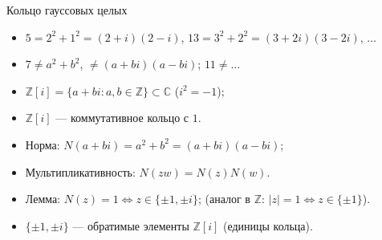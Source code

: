 \documentclass[serif, aspectratio=169]{beamer}
\begin{document}
\begin{frame}{Кольцо гауссовых целых}
    \begin{itemize}
        \item $5=2^2+1^2=(2+i)(2-i)$, $13=3^2+2^2=(3+2i)(3-2i)$, $\dots$
        \item $7\neq a^2+b^2$, $\neq (a+bi)(a-bi)$; $11\neq\dots$
        \item $\mathbb{Z}[i] = \{a+bi : a,b\in\mathbb{Z}\}\subset\mathbb{C}$ ($i^2=-1$);
        \item $\mathbb{Z}[i]$ --- коммутативное кольцо с $1$.
        \item Норма: $N(a+bi)=a^2+b^2=(a+bi)(a-bi)$;
        \item Мультипликативность: $N(zw)=N(z)N(w)$.
        \item Лемма: $N(z)=1 \Leftrightarrow z\in\{\pm1,\pm i\}$; (аналог в $\mathbb{Z}$: $|z|=1 \Leftrightarrow z\in\{\pm1\}$).
        \item $\{\pm1,\pm i\}$ --- обратимые элементы $\mathbb{Z}[i]$ (единицы кольца).
    \end{itemize}
\end{frame}
\end{document}
